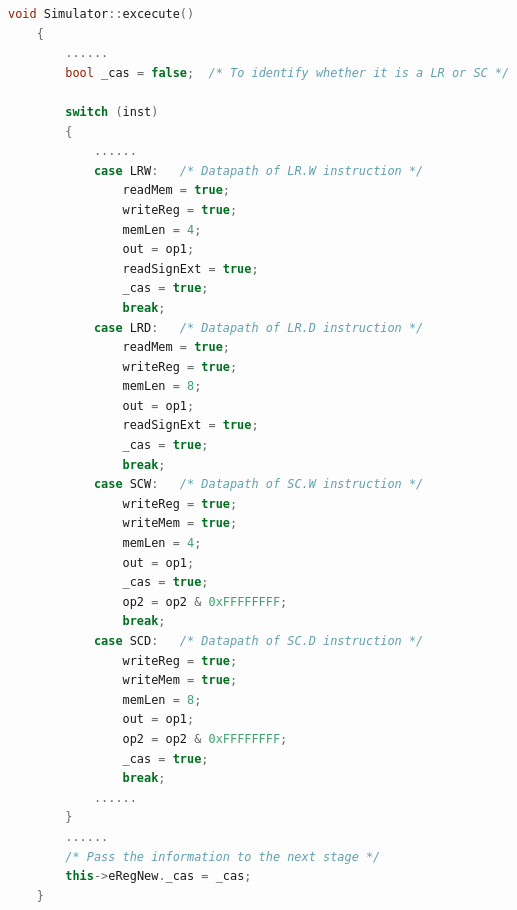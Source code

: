 \documentclass{article}
\begin{document}
\begin{lstlisting}[language=c++]
    void Simulator::excecute()
    {
        ......
        bool _cas = false;  /* To identify whether it is a LR or SC */

        switch (inst)
        {
            ......
            case LRW:   /* Datapath of LR.W instruction */
                readMem = true;
                writeReg = true;
                memLen = 4;
                out = op1;
                readSignExt = true;
                _cas = true;
                break;
            case LRD:   /* Datapath of LR.D instruction */
                readMem = true;
                writeReg = true;
                memLen = 8;
                out = op1;
                readSignExt = true;
                _cas = true;
                break;
            case SCW:   /* Datapath of SC.W instruction */
                writeReg = true;
                writeMem = true;
                memLen = 4;
                out = op1;
                _cas = true;
                op2 = op2 & 0xFFFFFFFF;
                break;
            case SCD:   /* Datapath of SC.D instruction */
                writeReg = true;
                writeMem = true;
                memLen = 8;
                out = op1;
                op2 = op2 & 0xFFFFFFFF;
                _cas = true;
                break;
            ......
        }
        ......
        /* Pass the information to the next stage */
        this->eRegNew._cas = _cas;  
    }


\end{lstlisting}
\end{document}
